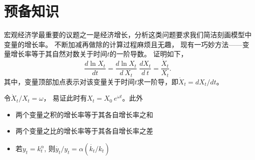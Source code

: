 \documentclass[cn,normal,11pt,black]{elegantnote}
\begin{document}
\newpage
\section{预备知识}
\begin{theorem}[变量的增长率]
    宏观经济学最重要的议题之一是经济增长，分析这类问题要求我们简洁刻画模型中变量的增长率。
    不断加减再做除的计算过程麻烦且无趣，
    现有一巧妙方法——变量增长率等于其自然对数关于时间$t$的一阶导数。
    证明如下，
    \begin{equation*}
        \frac{d \ln X_t}{d t} = \frac{d \ln X_t}{d \ X_t} \; \frac{d X_t}{d \ t} 
                                = \frac{\dot{X}_t}{X_t} .
    \end{equation*}
    其中，变量顶部加点表示对该变量关于时间$t$求一阶导，即$\dot{X}_t =  d X_t / d t$。

\end{theorem}

\begin{proposition}[增长率的基本性质]
    令$\dot{X}_t/X_t = \omega$，
    易证此时有$X_t = X_0 \ e^{\omega t}$。此外
    \begin{itemize}
        \item 两个变量之积的增长率等于其各自增长率之和
        \item 两个变量之比的增长率等于其各自增长率之差
        \item 若$y_t=k_t^\alpha$, 则$\dot{y_t}/y_t = \alpha (\dot{k_t}/k_t)$
    \end{itemize}
\end{proposition}
\end{document}
